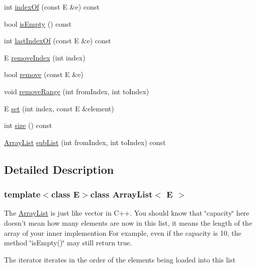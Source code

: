\begin{DoxyCompactItemize}
\item 
int \hyperlink{class_array_list_aafeb94867c79626bb829ad4b471bfcb2}{indexOf} (const E \&e) const 
\item 
bool \hyperlink{class_array_list_abfb328475abc7c9f4931232688be23b9}{isEmpty} () const 
\item 
int \hyperlink{class_array_list_a95ec02cc44cee3495beccf5364133625}{lastIndexOf} (const E \&e) const 
\item 
E \hyperlink{class_array_list_a87860785d580e03a925122ce7abe5457}{removeIndex} (int index)
\item 
bool \hyperlink{class_array_list_a489a4fbf04c42a05aa283f06d128977e}{remove} (const E \&e)
\item 
void \hyperlink{class_array_list_abe7beae5227c494abbf185afb935d547}{removeRange} (int fromIndex, int toIndex)
\item 
E \hyperlink{class_array_list_ab341d881c100b94b0184117419417288}{set} (int index, const E \&element)
\item 
int \hyperlink{class_array_list_a9c6533b2c52ae75d8248d9f620d62fec}{size} () const 
\item 
\hyperlink{class_array_list}{ArrayList} \hyperlink{class_array_list_aace6498dc396a248c3451039129921b2}{subList} (int fromIndex, int toIndex) const 
\end{DoxyCompactItemize}


\subsection{Detailed Description}
\subsubsection*{template$<$class E$>$class ArrayList$<$ E $>$}

The \hyperlink{class_array_list}{ArrayList} is just like vector in C++. You should know that \char`\"{}capacity\char`\"{} here doesn't mean how many elements are now in this list, it means the length of the array of your inner implemention For example, even if the capacity is 10, the method \char`\"{}isEmpty()\char`\"{} may still return true.

The iterator iterates in the order of the elements being loaded into this list 

